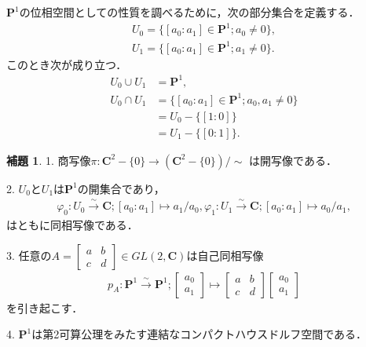 \documentclass[11pt, a4paper, dvipdfmx, draft]{jsarticle}
\theoremstyle{definition}
\newtheorem{Lemma}[Axiom]{補題}
\newcommand{\cc}{\mathbf{C}}
\newcommand{\pp}{\mathbf{P}}
\newcommand{\dip}{\displaystyle} %
\newcommand{\pphi}{\varphi} %
\theoremstyle{mystyle}
\begin{document}
$\pp^1$の位相空間としての性質を調べるために，次の部分集合を定義する．
\begin{align*}
    U_0=\{[a_0\colon a_1]\in\pp^1; a_0\neq0\},\\
    U_1=\{[a_0\colon a_1]\in\pp^1; a_1\neq0\}.
\end{align*}
このとき次が成り立つ．
\begin{align*}
    U_0\cup U_1 &= \pp^1,\\
    U_0\cap U_1 
    &= \{[a_0\colon a_1]\in\pp^1; a_0, a_1\neq0\}\\
    &= U_0 - \{[1\colon 0]\}\\
    &= U_1 - \{[0\colon 1]\}.
\end{align*}

\begin{Lemma}\label{mnf:p1}
    1. 
    商写像$\pi \colon \cc^{2}-\{0\}
    \longrightarrow\left(\cc^{2}-\{0\}\right)/{\sim}$
    は開写像である．

    2. 
    $U_0$と$U_1$は$\pp^1$の開集合であり，
    \begin{align*}
        \pphi_0\colon U_0\overset{{\sim}}{\longrightarrow}\cc; [a_0\colon a_1]\mapsto a_1/a_0,
        \pphi_1\colon U_1\overset{{\sim}}{\longrightarrow}\cc; [a_0\colon a_1]\mapsto a_0/a_1,
    \end{align*}
    はともに同相写像である．

    3. 
    任意の$\dip A = \begin{bmatrix}
        a&b\\c&d
    \end{bmatrix}\in GL(2,\cc)$は自己同相写像
    \begin{align*}
        p_A\colon \pp^1\overset{{\sim}}{\longrightarrow}\pp^1;
        \begin{bmatrix}
            a_0\\a_1
        \end{bmatrix}
        \mapsto
        \begin{bmatrix}
            a&b\\c&d
        \end{bmatrix}
        \begin{bmatrix}
            a_0\\a_1
        \end{bmatrix}
    \end{align*}
    を引き起こす．

    4. 
    $\pp^1$は第2可算公理をみたす連結なコンパクトハウスドルフ空間である．
\end{Lemma}
\end{document}

